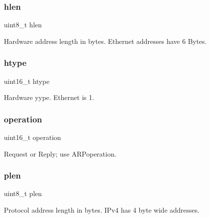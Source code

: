 \subsubsection{\texorpdfstring{hlen}{hlen}}
{\footnotesize\ttfamily uint8\+\_\+t hlen}



Hardware address length in bytes. Ethernet addresses have 6 Bytes. 

\mbox{\label{struct_a_r_pmessage__t_aaf87c38602b614bc7896cf7a5a90d372}} 
\subsubsection{\texorpdfstring{htype}{htype}}
{\footnotesize\ttfamily uint16\+\_\+t htype}



Hardware yype. Ethernet is 1. 

\mbox{\label{struct_a_r_pmessage__t_ad21c763fa2f80cb8649108b759113b54}} 
\subsubsection{\texorpdfstring{operation}{operation}}
{\footnotesize\ttfamily uint16\+\_\+t operation}



Request or Reply; use A\+R\+Poperation. 

\mbox{\label{struct_a_r_pmessage__t_ae414f6c2299d9cf0eff8aa8e81f538d8}} 
\subsubsection{\texorpdfstring{plen}{plen}}
{\footnotesize\ttfamily uint8\+\_\+t plen}



Protocol address length in bytes. I\+Pv4 has 4 byte wide addresses. 

\mbox{\label{struct_a_r_pmessage__t_ab4891e9b77eb26f33d21cfde982564cb}} 
